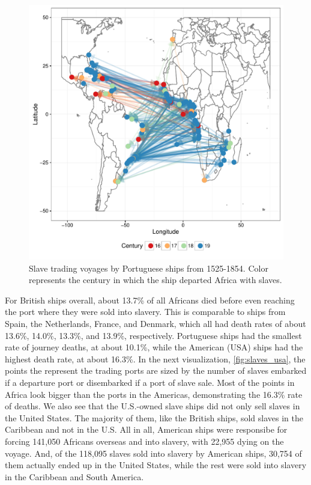 \documentclass[DIV=calc, paper=a4, fontsize=10pt, twocolumn]{scrartcl}\usepackage[]{graphicx}\usepackage[]{color}
\makeatletter
\def\maxwidth{ %
  \ifdim\Gin@nat@width>\linewidth
    \linewidth
  \else
    \Gin@nat@width
  \fi
}
\newenvironment{knitrout}{}{} %
\makeatother
\begin{document}
\begin{knitrout}
\color{fgcolor}\begin{figure}[h]
\includegraphics[width=\maxwidth]{figure/portugal-1} \caption[Slave trading voyages by Portuguese ships from 1525-1854]{Slave trading voyages by Portuguese ships from 1525-1854. Color represents the century in which the ship departed Africa with slaves.}\label{fig:portugal}
\end{figure}


\end{knitrout}




\par For British ships overall, about 13.7\% of all Africans died before even reaching the port where they were sold into slavery. This is comparable to ships from Spain, the Netherlands, France, and Denmark, which all had death rates of about 13.6\%, 14.0\%, 13.3\%, and 13.9\%, respectively.  Portuguese ships had the smallest rate of journey deaths, at about 10.1\%, while the American (USA) ships had the highest death rate, at about 16.3\%. In the next visualization, \autoref{fig:slaves_usa}, the points the represent the trading ports are sized by the number of slaves embarked if a departure port or disembarked if a port of slave sale. Most of the points in Africa look bigger than the ports in the Americas, demonstrating the 16.3\% rate of deaths. We also see that the U.S.-owned slave ships did not only sell slaves in the United States. The majority of them, like the British ships, sold slaves in the Caribbean and not in the U.S. All in all, American ships were responsibe for forcing 141,050 Africans overseas and into slavery, with 22,955 dying on the voyage. And, of the 118,095 slaves sold into slavery by American ships, 30,754 of them actually ended up in the United States, while the rest were sold into slavery in the Caribbean and South America.
\end{document}
